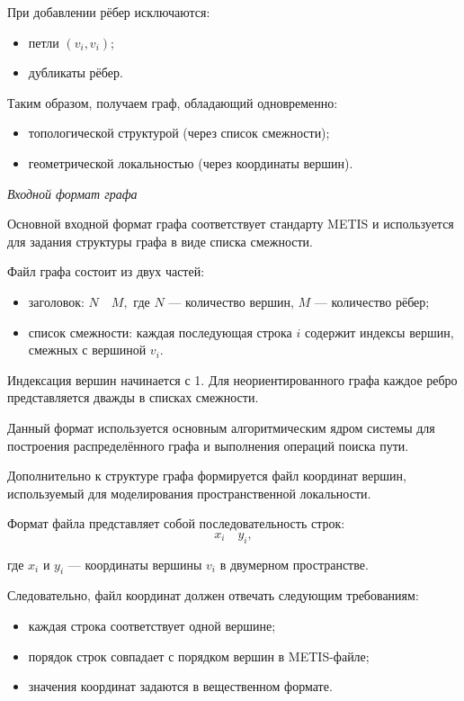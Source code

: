 При добавлении рёбер исключаются:
\begin{itemize}
    \item петли $(v_i, v_i)$;
    \item дубликаты рёбер.
\end{itemize}

Таким образом, получаем граф, обладающий одновременно:
\begin{itemize}
    \item топологической структурой (через список смежности);
    \item геометрической локальностью (через координаты вершин).
\end{itemize}

\textit{Входной формат графа}

Основной входной формат графа соответствует стандарту METIS и используется для задания структуры графа в виде списка смежности.

Файл графа состоит из двух частей:
\begin{itemize}
    \item заголовок: $N \quad M,$ где $N$ --- количество вершин, $M$ --- количество рёбер;
    \item список смежности: каждая последующая строка $i$ содержит индексы вершин, смежных с вершиной $v_i$.
\end{itemize}

Индексация вершин начинается с 1. Для неориентированного графа каждое ребро представляется дважды в списках смежности.

Данный формат используется основным алгоритмическим ядром системы для построения распределённого графа и выполнения операций поиска пути.

Дополнительно к структуре графа формируется файл координат вершин, используемый для моделирования пространственной локальности.

Формат файла представляет собой последовательность строк:
\begin{equation*}
    x_i \quad y_i,
\end{equation*}

где $x_i$ и $y_i$ --- координаты вершины $v_i$ в двумерном пространстве.

Следовательно, файл координат должен отвечать следующим требованиям:
\begin{itemize}
    \item каждая строка соответствует одной вершине;
    \item порядок строк совпадает с порядком вершин в METIS-файле;
    \item значения координат задаются в вещественном формате.
\end{itemize}

